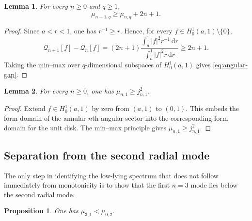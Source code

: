 \documentclass[11pt,letterpaper,reqno]{amsart}
\newtheorem{lemma}[lemma]{Lemma}
\newtheorem{proposition}[proposition]{Proposition}
\theoremstyle{definition}
\newcommand{\dd}{\,\mathrm{d}}
\begin{document}
\begin{lemma}\label{lem:angular-monotonicity}
For every $n\geq0$ and $q\geq1$,
\begin{equation}\label{eq:angular-gap}
 \mu_{n+1,q}\geq\mu_{n,q}+2n+1.
\end{equation}
\end{lemma}

\begin{proof}
Since $a<r<1$, one has $r^{-1}\geq r$. Hence, for every
$f\in H_0^1(a,1)\setminus\{0\}$,
\[
 \mathcal{Q}_{n+1}[f]-\mathcal{Q}_n[f]
 =(2n+1)\frac{\int_a^1|f|^2r^{-1}\dd r}
 {\int_a^1|f|^2r\dd r}
 \geq2n+1.
\]
Taking the min--max over \(q\)-dimensional subspaces of \(H_0^1(a,1)\) gives \eqref{eq:angular-gap}.
\end{proof}

\begin{lemma}\label{lem:disk-sector}
For every $n\geq0$, one has $\mu_{n,1}\geq j_{n,1}^2$.
\end{lemma}

\begin{proof}
Extend \(f\in H_0^1(a,1)\) by zero from \((a,1)\) to \((0,1)\).
This embeds the form domain of the annular $n$th angular sector into the
corresponding form domain for the unit disk.  The min--max principle gives
$\mu_{n,1}\geq j_{n,1}^2$.
\end{proof}



\subsection{Separation from the second radial mode}

The only step in identifying the low-lying spectrum that does not follow
immediately from monotonicity is to show that the first $n=3$ mode lies
below the second radial mode.

\begin{proposition}\label{prop:sector-separation}
One has $\mu_{3,1}<\mu_{0,2}$.
\end{proposition}
\end{document}
